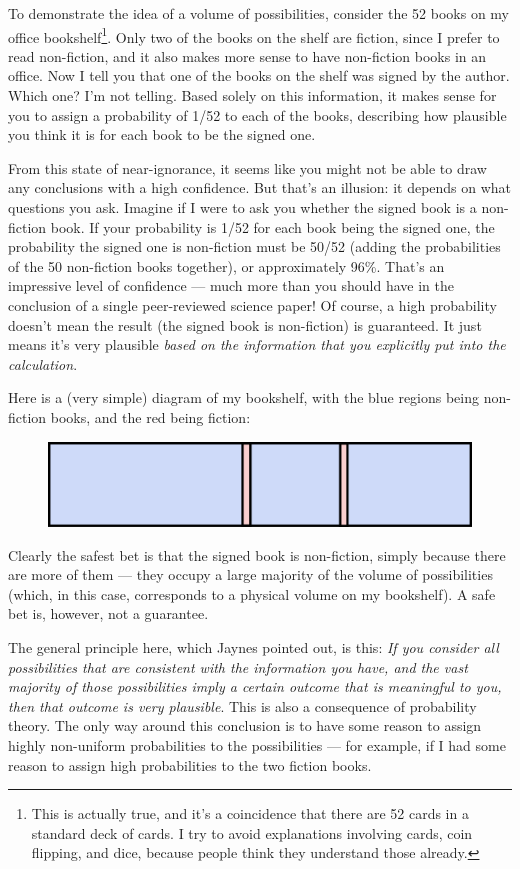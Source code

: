 \documentclass[a4paper, 12pt]{article}
\begin{document}
To demonstrate the idea of a volume of possibilities,
consider the 52 books on my office bookshelf\footnote{This
is actually true, and it's a coincidence that there are 52 cards in a standard
deck of cards. I try to avoid explanations involving cards, coin flipping, and
dice, because people think they understand those already.}.
Only two of the books on the shelf are fiction, since I prefer to read
non-fiction, and it also makes more sense to have non-fiction books in an
office. Now I tell you that one of the books on the shelf was
signed by the author. Which one? I'm not telling. Based solely on this
information, it makes sense for you to assign a probability of 1/52 to each of the
books, describing how plausible you think it is for each book to be the signed
one.

From this state of near-ignorance, it seems like you might not be able to draw
any conclusions with a high confidence. But that's an illusion: it depends on
what questions you ask. Imagine if I were to ask you whether the signed book
is a non-fiction book. If your probability is 1/52 for each book being the
signed one, the probability the signed one is non-fiction must be
50/52 (adding the probabilities of the 50 non-fiction books together), 
or approximately 96\%. That's an impressive level of confidence --- much more than you should have in the conclusion of a single peer-reviewed science paper!
Of course, a high probability doesn't mean the result (the signed book is
non-fiction) is guaranteed. It just means it's very plausible {\em based on the
information that you explicitly put into the calculation}.

Here is a (very simple) diagram of my bookshelf, with the blue regions
being non-fiction books, and the red being fiction:
\begin{figure}[ht!]
\centering
\includegraphics{bookshelf.png}
\end{figure}
Clearly the safest bet is that the signed book is non-fiction, simply because
there are more of them --- they occupy a large majority of the volume of
possibilities (which, in this case, corresponds to a physical volume on my
bookshelf). A safe bet is, however, not a guarantee.

The general principle here, which Jaynes pointed out, is this:
{\em If you consider all possibilities that are consistent with
the information you have, and the vast majority of those possibilities
imply a certain outcome that is meaningful to you, then that outcome is very
plausible}. This is also a consequence of probability theory. The only
way around this conclusion is to have some reason to assign highly
non-uniform probabilities to the possibilities --- for example, if I had
some reason to assign high probabilities to the two fiction books.
\end{document}
